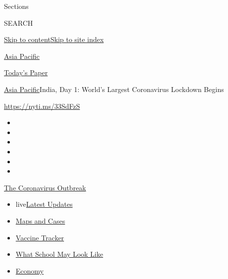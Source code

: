 Sections

SEARCH

\protect\hyperlink{site-content}{Skip to
content}\protect\hyperlink{site-index}{Skip to site index}

\href{https://www.nytimes.com/section/world/asia}{Asia Pacific}

\href{https://myaccount.nytimes.com/auth/login?response_type=cookie\&client_id=vi}{}

\href{https://www.nytimes.com/section/todayspaper}{Today's Paper}

\href{/section/world/asia}{Asia Pacific}\textbar{}India, Day 1: World's
Largest Coronavirus Lockdown Begins

\url{https://nyti.ms/33SdFzS}

\begin{itemize}
\item
\item
\item
\item
\item
\item
\end{itemize}

\href{https://www.nytimes.com/news-event/coronavirus?action=click\&pgtype=Article\&state=default\&region=TOP_BANNER\&context=storylines_menu}{The
Coronavirus Outbreak}

\begin{itemize}
\tightlist
\item
  live\href{https://www.nytimes.com/2020/08/02/world/coronavirus-updates.html?action=click\&pgtype=Article\&state=default\&region=TOP_BANNER\&context=storylines_menu}{Latest
  Updates}
\item
  \href{https://www.nytimes.com/interactive/2020/us/coronavirus-us-cases.html?action=click\&pgtype=Article\&state=default\&region=TOP_BANNER\&context=storylines_menu}{Maps
  and Cases}
\item
  \href{https://www.nytimes.com/interactive/2020/science/coronavirus-vaccine-tracker.html?action=click\&pgtype=Article\&state=default\&region=TOP_BANNER\&context=storylines_menu}{Vaccine
  Tracker}
\item
  \href{https://www.nytimes.com/interactive/2020/07/29/us/schools-reopening-coronavirus.html?action=click\&pgtype=Article\&state=default\&region=TOP_BANNER\&context=storylines_menu}{What
  School May Look Like}
\item
  \href{https://www.nytimes.com/live/2020/07/31/business/stock-market-today-coronavirus?action=click\&pgtype=Article\&state=default\&region=TOP_BANNER\&context=storylines_menu}{Economy}
\end{itemize}


